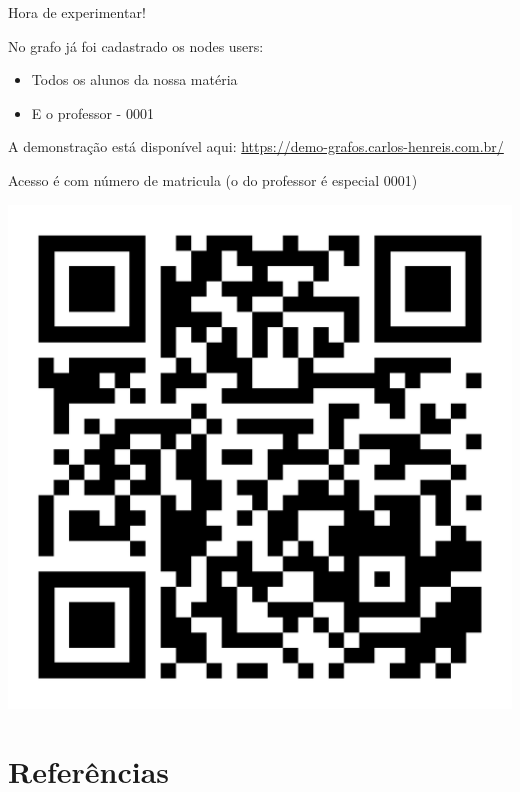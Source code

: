 \documentclass{if-beamer}
\begin{document}
\begin{frame}{Hora de experimentar!}
	
	\begin{minipage}{.75\textwidth}
		No grafo já foi cadastrado os nodes users:	
		\begin{itemize}%
			\item Todos os alunos da nossa matéria
			\item E o professor - 0001
		\end{itemize}
		A demonstração está disponível aqui: \url{ https://demo-grafos.carlos-henreis.com.br/}\par
		Acesso é com número de matricula (o do professor é especial 0001)
	\end{minipage}
	\hfill
	\begin{minipage}{.25\textwidth}
		\includegraphics[scale=0.03]{Figuras/qr-code.pdf}
	\end{minipage}

\end{frame}


\section{Referências} 
\end{document}
